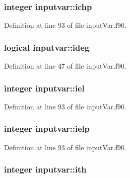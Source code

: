 \hypertarget{classinputvar_af57151a30c510558682b98e1b72d844b}{
\subsubsection[{ichp}]{\setlength{\rightskip}{0pt plus 5cm}integer inputvar\-::ichp}}\label{classinputvar_af57151a30c510558682b98e1b72d844b}


Definition at line 93 of file input\-Var.\-f90.

\hypertarget{classinputvar_a62235e6c8b16a98c1aea10ac01e11ac9}{
\subsubsection[{ideg}]{\setlength{\rightskip}{0pt plus 5cm}logical inputvar\-::ideg}}\label{classinputvar_a62235e6c8b16a98c1aea10ac01e11ac9}


Definition at line 47 of file input\-Var.\-f90.

\hypertarget{classinputvar_a6f9a3a8beea8f6e1aa8140bab654a48f}{
\subsubsection[{iel}]{\setlength{\rightskip}{0pt plus 5cm}integer inputvar\-::iel}}\label{classinputvar_a6f9a3a8beea8f6e1aa8140bab654a48f}


Definition at line 93 of file input\-Var.\-f90.

\hypertarget{classinputvar_a0190bc42c3dad91d811c585952ff55f4}{
\subsubsection[{ielp}]{\setlength{\rightskip}{0pt plus 5cm}integer inputvar\-::ielp}}\label{classinputvar_a0190bc42c3dad91d811c585952ff55f4}


Definition at line 93 of file input\-Var.\-f90.

\hypertarget{classinputvar_a4bba5fd8a8c399940c4b81e4da0cc9ce}{
\subsubsection[{ith}]{\setlength{\rightskip}{0pt plus 5cm}integer inputvar\-::ith}}\label{classinputvar_a4bba5fd8a8c399940c4b81e4da0cc9ce}


